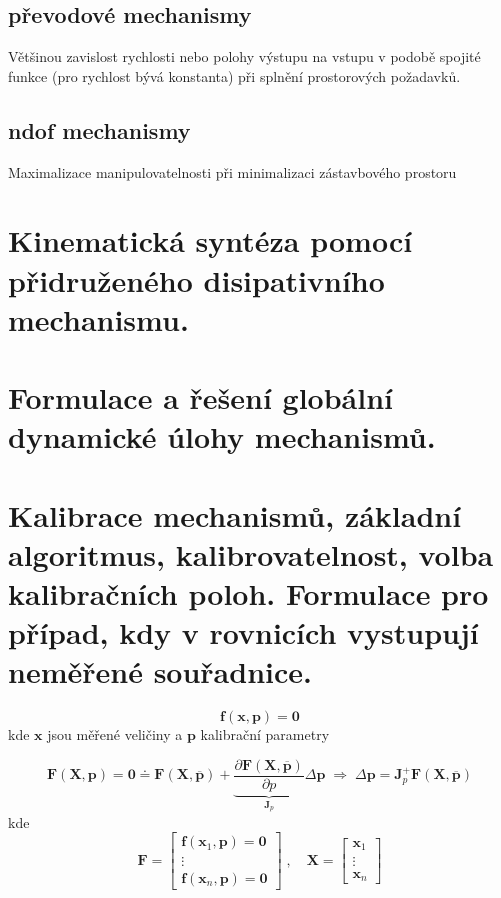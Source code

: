 \documentclass{article}
\begin{document}
	\subsection*{převodové mechanismy}
	Většinou zavislost rychlosti nebo polohy výstupu na vstupu v podobě spojité funkce (pro rychlost bývá konstanta) při splnění prostorových požadavků.

	\subsection*{ndof mechanismy}
	Maximalizace manipulovatelnosti při minimalizaci zástavbového prostoru

	\section{Kinematická syntéza pomocí přidruženého disipativního mechanismu.}

	\section{Formulace a řešení globální dynamické úlohy mechanismů. }

	\section{Kalibrace mechanismů, základní algoritmus, kalibrovatelnost, volba kalibračních poloh. Formulace pro případ, kdy v rovnicích vystupují neměřené souřadnice.}

	\begin{equation}
		\bm{f}(\bm{x},\bm{p}) = \bm{0}
	\end{equation}
	kde $\bm{x}$ jsou měřené veličiny a $\bm{p}$ kalibrační parametry

	\begin{equation}
		\bm{F}(\bm{X},\bm{p})
		=
		\bm{0} \doteq \bm{F}(\bm{X},\bm{\overline{p}})
		+
		\underbrace{\frac{\partial \bm{F}(\bm{X},\bm{\overline{p}})}{\partial p}}_{\bm{J}_p} \Delta\bm{p}
		\;\Rightarrow\;
		\Delta\bm{p} = \bm{J}_p^+ \bm{F}(\bm{X},\bm{\overline{p}})
	\end{equation}
	kde
	\begin{equation}
		\bm{F}
		=
		\begin{bmatrix}
			\bm{f}(\bm{x}_1,\bm{p}) = \bm{0} \\
			\vdots \\
			\bm{f}(\bm{x}_n,\bm{p}) = \bm{0}
		\end{bmatrix}
		\;,\quad 
		\bm{X}
		=
		\begin{bmatrix}
			\bm{x}_1 \\
			\vdots \\
			\bm{x}_n
		\end{bmatrix}
	\end{equation}
\end{document}
